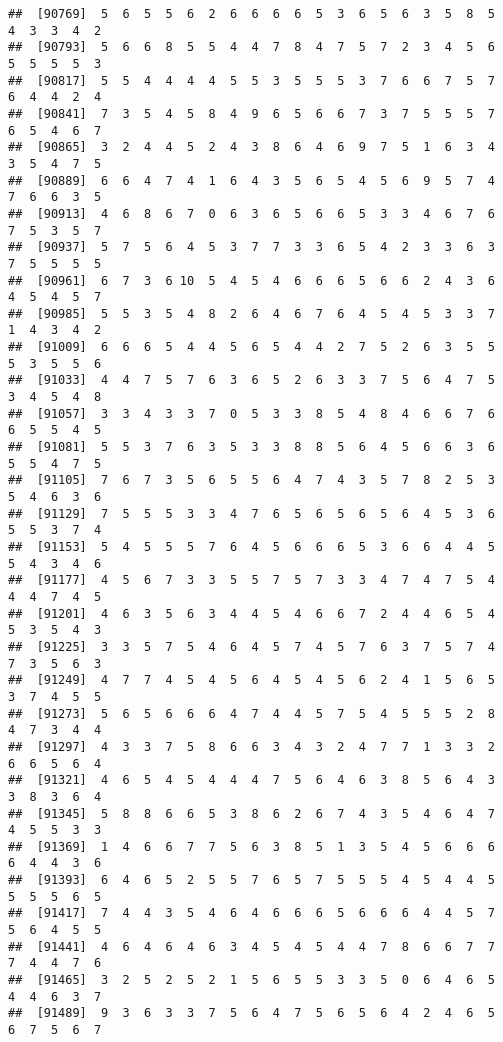 \documentclass[
]{book}
\begin{document}
\begin{verbatim}
##  [90769]  5  6  5  5  6  2  6  6  6  6  5  3  6  5  6  3  5  8  5  4  3  3  4  2
##  [90793]  5  6  6  8  5  5  4  4  7  8  4  7  5  7  2  3  4  5  6  5  5  5  5  3
##  [90817]  5  5  4  4  4  4  5  5  3  5  5  5  3  7  6  6  7  5  7  6  4  4  2  4
##  [90841]  7  3  5  4  5  8  4  9  6  5  6  6  7  3  7  5  5  5  7  6  5  4  6  7
##  [90865]  3  2  4  4  5  2  4  3  8  6  4  6  9  7  5  1  6  3  4  3  5  4  7  5
##  [90889]  6  6  4  7  4  1  6  4  3  5  6  5  4  5  6  9  5  7  4  7  6  6  3  5
##  [90913]  4  6  8  6  7  0  6  3  6  5  6  6  5  3  3  4  6  7  6  7  5  3  5  7
##  [90937]  5  7  5  6  4  5  3  7  7  3  3  6  5  4  2  3  3  6  3  7  5  5  5  5
##  [90961]  6  7  3  6 10  5  4  5  4  6  6  6  5  6  6  2  4  3  6  4  5  4  5  7
##  [90985]  5  5  3  5  4  8  2  6  4  6  7  6  4  5  4  5  3  3  7  1  4  3  4  2
##  [91009]  6  6  6  5  4  4  5  6  5  4  4  2  7  5  2  6  3  5  5  5  3  5  5  6
##  [91033]  4  4  7  5  7  6  3  6  5  2  6  3  3  7  5  6  4  7  5  3  4  5  4  8
##  [91057]  3  3  4  3  3  7  0  5  3  3  8  5  4  8  4  6  6  7  6  6  5  5  4  5
##  [91081]  5  5  3  7  6  3  5  3  3  8  8  5  6  4  5  6  6  3  6  5  5  4  7  5
##  [91105]  7  6  7  3  5  6  5  5  6  4  7  4  3  5  7  8  2  5  3  5  4  6  3  6
##  [91129]  7  5  5  5  3  3  4  7  6  5  6  5  6  5  6  4  5  3  6  5  5  3  7  4
##  [91153]  5  4  5  5  5  7  6  4  5  6  6  6  5  3  6  6  4  4  5  5  4  3  4  6
##  [91177]  4  5  6  7  3  3  5  5  7  5  7  3  3  4  7  4  7  5  4  4  4  7  4  5
##  [91201]  4  6  3  5  6  3  4  4  5  4  6  6  7  2  4  4  6  5  4  5  3  5  4  3
##  [91225]  3  3  5  7  5  4  6  4  5  7  4  5  7  6  3  7  5  7  4  7  3  5  6  3
##  [91249]  4  7  7  4  5  4  5  6  4  5  4  5  6  2  4  1  5  6  5  3  7  4  5  5
##  [91273]  5  6  5  6  6  6  4  7  4  4  5  7  5  4  5  5  5  2  8  4  7  3  4  4
##  [91297]  4  3  3  7  5  8  6  6  3  4  3  2  4  7  7  1  3  3  2  6  6  5  6  4
##  [91321]  4  6  5  4  5  4  4  4  7  5  6  4  6  3  8  5  6  4  3  3  8  3  6  4
##  [91345]  5  8  8  6  6  5  3  8  6  2  6  7  4  3  5  4  6  4  7  4  5  5  3  3
##  [91369]  1  4  6  6  7  7  5  6  3  8  5  1  3  5  4  5  6  6  6  6  4  4  3  6
##  [91393]  6  4  6  5  2  5  5  7  6  5  7  5  5  5  4  5  4  4  5  5  5  5  6  5
##  [91417]  7  4  4  3  5  4  6  4  6  6  6  5  6  6  6  4  4  5  7  5  6  4  5  5
##  [91441]  4  6  4  6  4  6  3  4  5  4  5  4  4  7  8  6  6  7  7  7  4  4  7  6
##  [91465]  3  2  5  2  5  2  1  5  6  5  5  3  3  5  0  6  4  6  5  4  4  6  3  7
##  [91489]  9  3  6  3  3  7  5  6  4  7  5  6  5  6  4  2  4  6  5  6  7  5  6  7

\end{verbatim}
\end{document}
